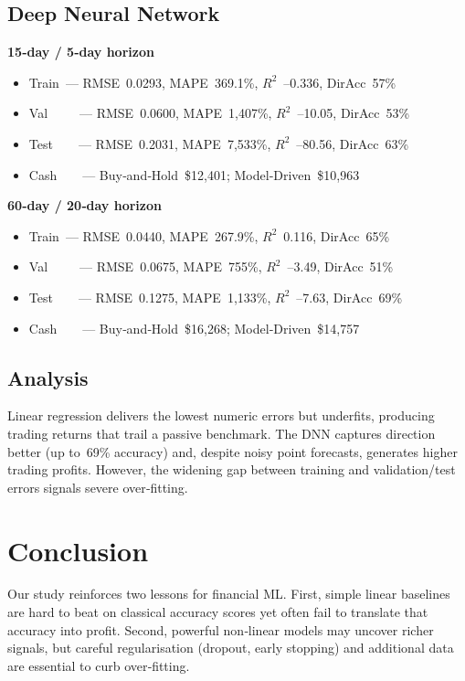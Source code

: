 \documentclass[sigconf]{acmart}
\begin{document}
\subsection{Deep Neural Network}
\textbf{15‑day / 5‑day horizon}
\begin{itemize}
  \item Train — RMSE 0.0293, MAPE 369.1\%, $R^2$ –0.336, DirAcc 57\%
  \item Val     — RMSE 0.0600, MAPE 1,407\%, $R^2$ –10.05, DirAcc 53\%
  \item Test    — RMSE 0.2031, MAPE 7,533\%, $R^2$ –80.56, DirAcc 63\%
  \item Cash    — Buy‑and‑Hold \$12,401; Model‑Driven \$10,963
\end{itemize}

\textbf{60‑day / 20‑day horizon}
\begin{itemize}
  \item Train — RMSE 0.0440, MAPE 267.9\%, $R^2$ 0.116, DirAcc 65\%
  \item Val     — RMSE 0.0675, MAPE 755\%, $R^2$ –3.49, DirAcc 51\%
  \item Test    — RMSE 0.1275, MAPE 1,133\%, $R^2$ –7.63, DirAcc 69\%
  \item Cash    — Buy‑and‑Hold \$16,268; Model‑Driven \$14,757
\end{itemize}

\subsection{Analysis}
Linear regression delivers the 
lowest numeric errors but underfits, producing trading returns that trail a passive benchmark.  The DNN captures direction better (up to 69\% accuracy) and, despite noisy point forecasts, generates higher trading profits.  However, the widening gap between training and validation/test errors signals severe over‑fitting.

\section{Conclusion}
Our study reinforces two lessons for financial ML.  First, simple linear baselines are hard to beat on classical accuracy scores yet often fail to translate that accuracy into profit.  Second, powerful non‑linear models may uncover richer signals, but careful regularisation (dropout, early stopping) and additional data are essential to curb over‑fitting.
\end{document}
